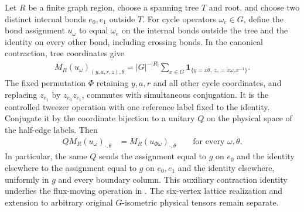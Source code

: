 \begin{lemma}%
    \label{thm:peps_regular_two_cycle_flux_move}
    \leanok
    Let $R$ be a finite graph region, choose a spanning tree $T$ and root,
    and choose two distinct internal bonds $e_0,e_1$ outside $T$.
    For cycle operators $\omega_e\in G$, define the bond assignment
    $u_\omega$ to equal $\omega_e$ on the internal bonds outside the tree
    and the identity on every other bond, including crossing bonds.
    In the canonical contraction, tree coordinates give
    \begin{align}
        M_R(u_\omega)_{(y,a,r,z),\theta}
        =|G|^{-|R|}\sum_{x\in G}
        \mathbf 1_{\{y=x\theta,\ z_e=x\omega_ex^{-1}\}}.
    \end{align}
    The fixed permutation $\Phi$ retaining $y,a,r$ and all other cycle coordinates,
    and replacing $z_{e_1}$ by $z_{e_0}z_{e_1}$, commutes with simultaneous
    conjugation. It is the controlled tweezer operation with one reference label
    fixed to the identity. Conjugate it by the coordinate bijection
    to a unitary $Q$ on the physical space of the half-edge labels. Then
    \begin{align}
        Q M_R(u_\omega)_{\cdot,\theta}
         & =M_R(u_{\Phi\omega})_{\cdot,\theta}
        \qquad\text{for every }\omega,\theta.
    \end{align}
    In particular, the same $Q$ sends the assignment equal to $g$ on $e_0$
    and the identity elsewhere to the assignment equal to $g$ on $e_0,e_1$
    and the identity elsewhere, uniformly in $g$ and every boundary column.
    This auxiliary contraction identity underlies the flux-moving
    operation in \cite[Theorem~6.16]{Schuch2010PEPS}.
    The six-vertex lattice realization and extension to arbitrary original
    $G$-isometric physical tensors remain separate.
\end{lemma}

